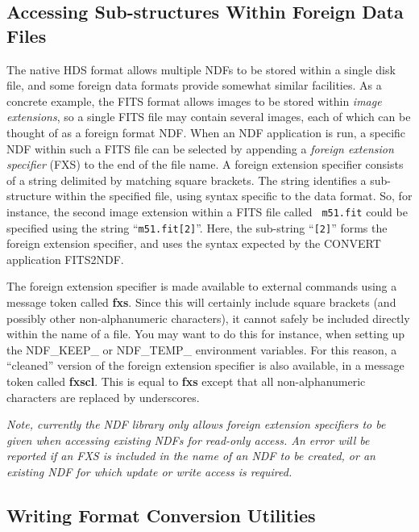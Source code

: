 \subsection{\label{sect:fxs}Accessing Sub-structures Within Foreign Data Files}
The native HDS format allows multiple NDFs to be stored within a single disk
file, and some foreign data formats provide somewhat similar facilities.
As a concrete example, the FITS format allows images to be stored within
{\em image extensions}, so a single FITS file may contain several images,
each of which can be thought of as a foreign format NDF. When an
NDF application is run, a specific NDF within such a FITS file can be
selected by appending a {\em foreign extension specifier} (FXS) to the
end of the file name. A foreign extension specifier consists of a string
delimited by matching square brackets. The string identifies a sub-structure 
within the specified file, using syntax specific to the data format. So,
for instance, the second image extension within a FITS file called {\tt
m51.fit} could be specified using the string ``{\tt m51.fit[2]}''. Here, the
sub-string ``{\tt [2]}'' forms the foreign extension specifier, and uses the
syntax expected by the CONVERT application FITS2NDF.

The foreign extension specifier is made available to external commands
using a message token called {\bf fxs}. Since this will certainly include
square brackets (and possibly other non-alphanumeric characters), it
cannot safely be included directly within the name of a file. You may
want to do this for instance, when setting up the NDF\_KEEP\_  or
NDF\_TEMP\_ environment variables. For this reason, a ``cleaned'' version
of the foreign extension specifier is also available, in a message token 
called {\bf fxscl}. This is equal to {\bf fxs} except that all
non-alphanumeric characters are replaced by underscores.

\begin{center}
{\em Note, currently the NDF library only allows foreign extension specifiers
to be given when accessing existing NDFs for read-only access. An error
will be reported if an FXS is included in the name of an NDF to be
created, or an existing NDF for which update or write access is required.}
\end{center}

\subsection{\label{sect:conversionutilities}Writing Format Conversion Utilities}


